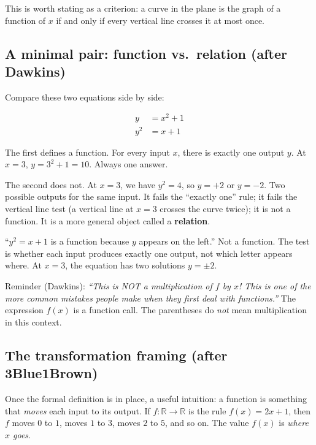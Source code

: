 This is worth stating as a criterion: a curve in the plane is the graph of a function of $x$ if and only if every vertical line crosses it at most once.

\subsection*{A minimal pair: function vs.\ relation (after Dawkins)}

Compare these two equations side by side:

\begin{align*}
  y &= x^2 + 1 \\
  y^2 &= x + 1
\end{align*}

The first defines a function. For every input $x$, there is exactly one output $y$. At $x = 3$, $y = 3^2 + 1 = 10$. Always one answer.

The second does not. At $x = 3$, we have $y^2 = 4$, so $y = +2$ or $y = -2$. Two possible outputs for the same input. It fails the ``exactly one'' rule; it fails the vertical line test (a vertical line at $x = 3$ crosses the curve twice); it is not a function. It is a more general object called a \textbf{relation}.

\begin{mistake}
``$y^2 = x + 1$ is a function because $y$ appears on the left.'' Not a function. The test is whether each input produces exactly one output, not which letter appears where. At $x = 3$, the equation has two solutions $y = \pm 2$.

Reminder (Dawkins): \textit{``This is NOT a multiplication of $f$ by $x$! This is one of the more common mistakes people make when they first deal with functions.''} The expression $f(x)$ is a function call. The parentheses do \emph{not} mean multiplication in this context.
\end{mistake}

\subsection*{The transformation framing (after 3Blue1Brown)}

Once the formal definition is in place, a useful intuition: a function is something that \emph{moves} each input to its output. If $f : \mathbb{R} \to \mathbb{R}$ is the rule $f(x) = 2x + 1$, then $f$ moves $0$ to $1$, moves $1$ to $3$, moves $2$ to $5$, and so on. The value $f(x)$ is \textit{where $x$ goes}.


